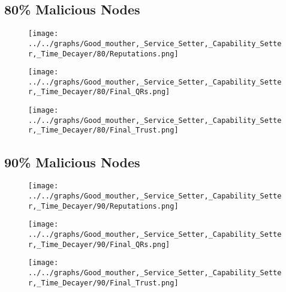 \begin{minipage}[t]{0.49\columnwidth}
\subsection*{80\% Malicious Nodes}
    \begin{figure}[H]
        \centering
        \texttt{[image: ../../graphs/Good\_mouther,\_Service\_Setter,\_Capability\_Setter,\_Time\_Decayer/80/Reputations.png]}
    \end{figure}
    \begin{figure}[H]
        \centering
        \texttt{[image: ../../graphs/Good\_mouther,\_Service\_Setter,\_Capability\_Setter,\_Time\_Decayer/80/Final\_QRs.png]}
    \end{figure}
\end{minipage}
\begin{minipage}[t]{0.49\columnwidth}
    \begin{figure}[H]
        \centering
        \texttt{[image: ../../graphs/Good\_mouther,\_Service\_Setter,\_Capability\_Setter,\_Time\_Decayer/80/Final\_Trust.png]}
    \end{figure}
\end{minipage}

\begin{minipage}[t]{0.49\columnwidth}
\subsection*{90\% Malicious Nodes}
    \begin{figure}[H]
        \centering
        \texttt{[image: ../../graphs/Good\_mouther,\_Service\_Setter,\_Capability\_Setter,\_Time\_Decayer/90/Reputations.png]}
    \end{figure}
    \begin{figure}[H]
        \centering
        \texttt{[image: ../../graphs/Good\_mouther,\_Service\_Setter,\_Capability\_Setter,\_Time\_Decayer/90/Final\_QRs.png]}
    \end{figure}
\end{minipage}
\begin{minipage}[t]{0.49\columnwidth}
    \begin{figure}[H]
        \centering
        \texttt{[image: ../../graphs/Good\_mouther,\_Service\_Setter,\_Capability\_Setter,\_Time\_Decayer/90/Final\_Trust.png]}
    \end{figure}
\end{minipage}

